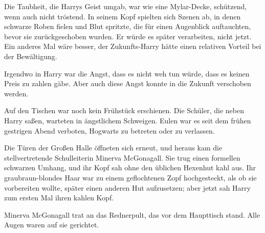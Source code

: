 Die Taubheit, die Harrys Geist umgab, war wie eine Mylar-Decke, schützend, wenn auch nicht tröstend. In seinem Kopf spielten sich Szenen ab, in denen schwarze Roben fielen und Blut spritzte, die für einen Augenblick auftauchten, bevor sie zurückgeschoben wurden. Er würde es später verarbeiten, nicht jetzt. Ein anderes Mal wäre besser, der Zukunfts-Harry hätte einen relativen Vorteil bei der Bewältigung.

Irgendwo in Harry war die Angst, dass es nicht weh tun würde, dass es keinen Preis zu zahlen gäbe. Aber auch diese Angst konnte in die Zukunft verschoben werden.

Auf den Tischen war noch kein Frühstück erschienen. Die Schüler, die neben Harry saßen, warteten in ängstlichem Schweigen. Eulen war es seit dem frühen gestrigen Abend verboten, Hogwarts zu betreten oder zu verlassen.

Die Türen der Großen Halle öffneten sich erneut, und heraus kam die stellvertretende Schulleiterin Minerva McGonagall. Sie trug einen formellen schwarzen Umhang, und ihr Kopf sah ohne den üblichen Hexenhut kahl aus. Ihr graubraun-blondes Haar war zu einem geflochtenen Zopf hochgesteckt, als ob sie vorbereiten wollte, später einen anderen Hut aufzusetzen; aber jetzt sah Harry zum ersten Mal ihren kahlen Kopf.

Minerva McGonagall trat an das Rednerpult, das vor dem Haupttisch stand. Alle Augen waren auf sie gerichtet.


